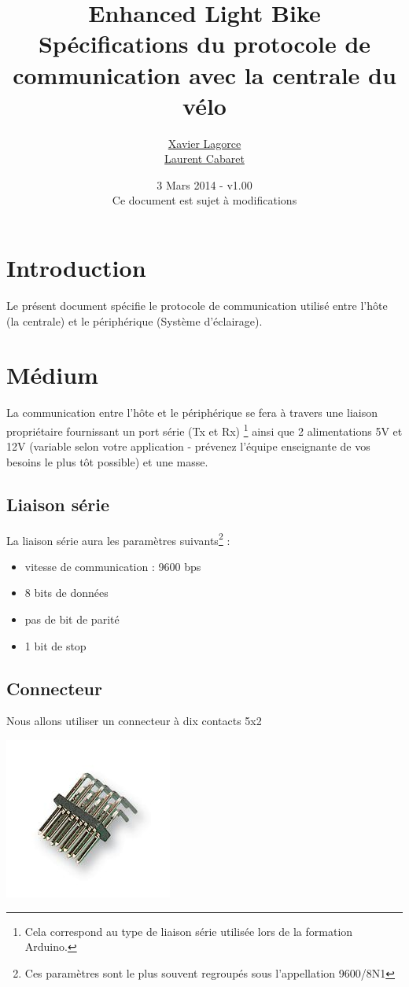 \documentclass[a4paper, 10pt]{article} %
\title{{\huge Enhanced Light Bike}\vspace{0.5cm}\\Spécifications du protocole de communication avec la centrale du vélo}
\author{\href{mailto:Xavier.Lagorce@crans.org}{Xavier Lagorce}\\\href{mailto:laurent.cabaret@ecp.fr}{Laurent Cabaret}}
\date{3 Mars 2014 - v1.00\\Ce document est sujet à modifications}
\newcommand{\saut}{\vspace{0.5cm}}
\begin{document}
\maketitle

\vspace{1cm}

\tableofcontents
\newpage

\section{Introduction}

Le présent document spécifie le protocole de communication utilisé entre l'hôte (la centrale)
et le périphérique (Système d'éclairage).

\section{Médium}

La communication entre l'hôte et le périphérique se fera à travers une liaison propriétaire fournissant un port série (Tx et Rx) \footnote{Cela correspond au type de liaison série utilisée lors de la formation Arduino.} ainsi que 2 alimentations 5V et 12V (variable selon votre application - prévenez l'équipe enseignante de vos besoins le plus tôt possible) et une masse.

\saut

\subsection{Liaison série}
La liaison série aura les paramètres suivants\footnote{Ces paramètres sont le plus souvent regroupés
sous l'appellation 9600/8N1} :
\begin{itemize}
  \item vitesse de communication : 9600 bps
  \item 8 bits de données
  \item pas de bit de parité
  \item 1 bit de stop
\end{itemize}

\subsection{Connecteur}

Nous allons utiliser un connecteur à dix contacts 5x2 

\begin{center}
\includegraphics[scale=0.5]{HE10.jpg}
\end{center}
\end{document}
